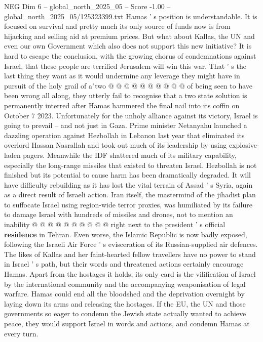 \begin{textsample}{NEG Dim 6 – global\_north\_2025\_05 – Score -1.00 – global\_north\_2025\_05/125323399.txt}
Hamas ' s position is understandable.
It is focused on survival and pretty much its only source of funds now is from hijacking and selling aid at premium prices.
But what about Kallas, the UN and even our own Government which also does not support this new initiative?
It is hard to escape the conclusion, with the growing chorus of condemnations against Israel, that these people are terrified Jerusalem will win this war.
That ' s the last thing they want as it would undermine any leverage they might have in pursuit of the holy grail of a"two @ @ @ @ @ @ @ @ @ @ of being seen to have been wrong all along, they utterly fail to recognise that a two state solution is permanently interred after Hamas hammered the final nail into its coffin on October 7 2023.
Unfortunately for the unholy alliance against its victory, Israel is going to prevail -- and not just in Gaza.
Prime minister Netanyahu launched a dazzling operation against Hezbollah in Lebanon last year that eliminated its overlord Hassan Nasrallah and took out much of its leadership by using explosive-laden pagers.
Meanwhile the IDF shattered much of its military capability, especially the long-range missiles that existed to threaten Israel.
Hezbollah is not finished but its potential to cause harm has been dramatically degraded.
It will have difficulty rebuilding as it has lost the vital terrain of Assad ' s Syria, again as a direct result of Israeli action.
Iran itself, the mastermind of the jihadist plan to suffocate Israel using region-wide terror proxies, was humiliated by its failure to damage Israel with hundreds of missiles and drones, not to mention an inability @ @ @ @ @ @ @ @ @ @ right next to the president ' s official \textbf{residence} in Tehran.
Even worse, the Islamic Republic is now badly exposed, following the Israeli Air Force ' s evisceration of its Russian-supplied air defences.
The likes of Kallas and her faint-hearted fellow travellers have no power to stand in Israel ' s path, but their words and threatened actions certainly encourage Hamas.
Apart from the hostages it holds, its only card is the vilification of Israel by the international community and the accompanying weaponisation of legal warfare.
Hamas could end all the bloodshed and the deprivation overnight by laying down its arms and releasing the hostages.
If the EU, the UN and those governments so eager to condemn the Jewish state actually wanted to achieve peace, they would support Israel in words and actions, and condemn Hamas at every turn.

\end{textsample}
